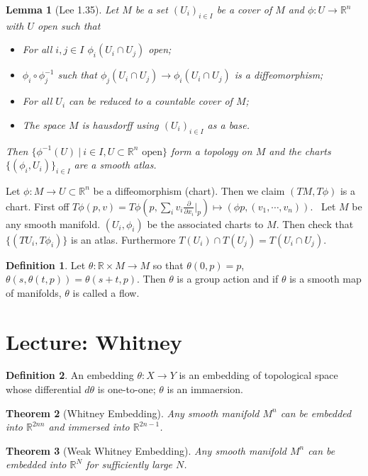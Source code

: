 \documentclass[11pt]{amsart}
\newtheorem{theorem}{Theorem}    %
\newtheorem{lemma}[theorem]{Lemma}
\theoremstyle{definition}
\newtheorem{definition}{Definition}
\begin{document}
\begin{lemma}[Lee 1.35]
	Let $M$ be a set $(U_i)_{i \in I}$ be a cover of $M$ and $\phi: U \to \mathbb{R}^n$ with $U$ open such that
	\begin{itemize}
	\item For all $i, j \in I$ $\phi_i(U_i \cap U_j)$ open;
	\item $\phi_i \circ \phi_j^{-1}$ such that $\phi_j(U_i \cap U_j) \to \phi_i(U_i \cap U_j)$ is a diffeomorphism;
	\item For all $U_i$ can be reduced to a countable cover of $M$;
	\item The space $M$ is hausdorff using $(U_i)_{i\in I}$ as a base.
	\end{itemize}
	{Then $\{\phi^{-1}(U)\ |\ i\in I, U \subset \mathbb{R}^n \text{ open} \}$ form a topology on $M$ and the charts $\{(\phi_i, U_i)\}_{i \in I}$ are a smooth atlas.}
\end{lemma}

Let $\phi: M \to U \subset \mathbb{R}^n$ be a diffeomorphism (chart). Then we claim $(TM, T\phi)$ is a chart. First off $T\phi(p,v) = T\phi(p, \sum_i v_i \frac{\partial}{\partial x_i}\big|_p) \mapsto (\phi p, (v_1, \cdots, v_n)).$ \ Let $M$ be any smooth manifold. $(U_i, \phi_i)$ be the associated charts to $M$. Then check that $\{(TU_i, T\phi_i)\}$ is an atlas. Furthermore $T(U_i) \cap T(U_j)  = T(U_i \cap U_j)$.



\begin{definition}
	Let $\theta: \mathbb{R} \times M \to M$ so that 
	$\theta(0, p) = p$, $\theta(s, \theta(t, p)) = \theta(s +t, p).$ Then $\theta$ is a group action and if $\theta$ is a smooth map of manifolds, $\theta$ is called a flow.
\end{definition}


\section{Lecture: Whitney}


\begin{definition}
	An embedding $\theta: X \to Y$ is an embedding of topological space whose differential $d\theta$ is one-to-one; $\theta$ is an immaersion.
\end{definition}


\begin{theorem}[Whitney Embedding] Any smooth manifold $M^n$ can be embedded into $\mathbb{R}^{2nn}$ and immersed into $\mathbb{R}^{2n -1}$.
\end{theorem}
\begin{theorem}[Weak Whitney Embedding] Any smooth manifold $M^n$ can be embedded into $\mathbb{R}^N$ for sufficiently large $N$.
\end{theorem}
\end{document}
